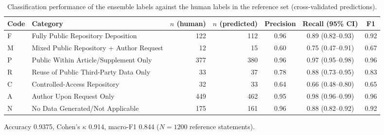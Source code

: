 \begin{table}[htbp]
\centering
\caption{Classification performance of the ensemble labels against the human labels in the reference set (cross-validated predictions).}
\label{tab:classifier_performance}
\small
\begin{tabular}{llrrccc}
\toprule
Code & Category & $n$ (human) & $n$ (predicted) & Precision & Recall (95\% CI) & F1 \\
\midrule
F & Fully Public Repository Deposition & 122 & 112 & 0.96 & 0.89 (0.82--0.93) & 0.92 \\
M & Mixed Public Repository + Author Request & 12 & 15 & 0.60 & 0.75 (0.47--0.91) & 0.67 \\
P & Public Within Article/Supplement Only & 377 & 380 & 0.96 & 0.97 (0.95--0.98) & 0.96 \\
R & Reuse of Public Third-Party Data Only & 33 & 37 & 0.78 & 0.88 (0.73--0.95) & 0.83 \\
C & Controlled-Access Repository & 32 & 33 & 0.64 & 0.66 (0.48--0.80) & 0.65 \\
A & Author Upon Request Only & 449 & 462 & 0.95 & 0.98 (0.96--0.99) & 0.96 \\
N & No Data Generated/Not Applicable & 175 & 161 & 0.96 & 0.88 (0.82--0.92) & 0.92 \\
\bottomrule
\end{tabular}
\par\smallskip
\footnotesize Accuracy 0.9375, Cohen's $\kappa$ 0.914, macro-F1 0.844 ($N=1200$ reference statements).
\end{table}
